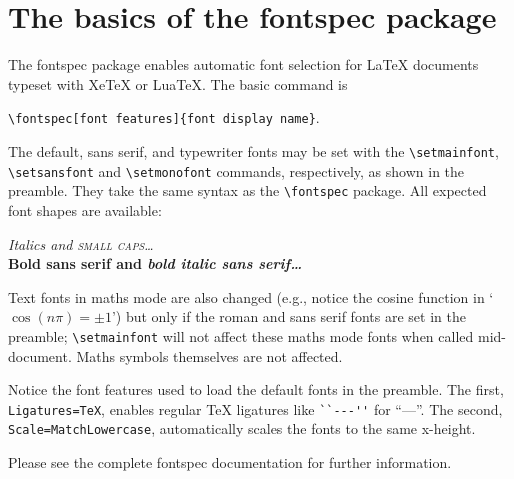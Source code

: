\documentclass{article}
\begin{document}
\pagestyle{empty}

\section*{The basics of the \textsf{fontspec} package}

The \textsf{fontspec} package enables automatic font selection
for \LaTeX{} documents typeset with Xe\TeX{} or Lua\TeX.
The basic command is

{\centering \verb|\fontspec[font features]{font display name}|.\par}

The default, sans serif, and typewriter fonts may be set with the
\verb|\setmainfont|, \verb|\setsansfont| and \verb|\setmonofont|
commands, respectively, as shown in the preamble. They take the
same syntax as the \verb|\fontspec| package. All expected font
shapes are available:

\begin{center}
  {\itshape Italics and \scshape small caps\dots}\\
  {\sffamily\bfseries Bold sans serif and \itshape bold italic sans serif\dots}
\end{center}

Text fonts in maths mode are also changed (e.g., notice the cosine function in
`$\cos(n\pi)=\pm 1$') but only if the roman and sans serif fonts are set in
the preamble; \verb|\setmainfont| will not affect these maths mode fonts when
called mid-document.
Maths symbols themselves are not affected.

Notice the font features used to load the default fonts in the preamble.
The first, \verb|Ligatures=TeX|, enables regular \TeX{} ligatures like
\verb|``---''| for ``---''.
The second, \verb|Scale=MatchLowercase|, automatically scales the fonts to
the same x-height.

Please see the complete \textsf{fontspec} documentation for further
information.
\end{document}
